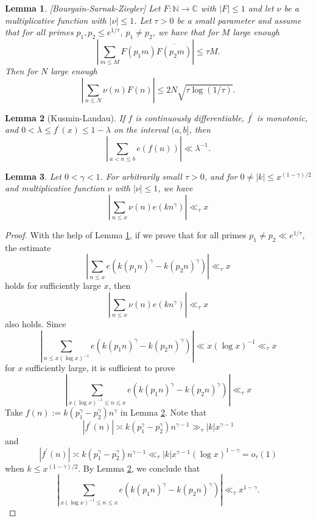 \documentclass[a4paper,10pt]{amsart}
\newtheorem{lemma}{Lemma}[section]
\begin{document}
\begin{lemma} \label{Le_BSZ} [Bourgain-Sarnak-Ziegler]
Let $F: \mathbb{N} \rightarrow \mathbb{C}$ with $|F|\leq 1$ and 
let $\nu$ be a multiplicative function with $|\nu|\leq 1$. Let $\tau>0$ 
be a small parameter and assume that for all primes 
$p_1,p_2\leq e^{1/\tau}$, $p_1\neq p_2$, we have that for $M$ 
large enough
\[
\left|\sum_{m\leq M} F(p_1m)\overline{F(p_2m)}\right|\leq \tau M.
\]
Then for $N$ large enough
\[
\left|\sum_{n\leq N} \nu(n) F(n)\right| \leq 2 N \sqrt{\tau \log (1/\tau)}.
\]
\end{lemma}


\begin{lemma} [Kusmin-Landau] \label{Le_Kus-Lan}
If $f$ is continuously differentiable, $f^\prime$ is monotonic, and $0<\lambda\leq f^\prime(x)\leq 1-\lambda$ on the interval $(a,b]$, then
\[
\left|\sum_{a<n\leq b}e(f(n))\right|\ll \lambda^{-1}.
\]
\end{lemma}

\begin{lemma} \label{Le_multi_exponential}
Let $0<\gamma<1$. For arbitrarily small $\tau>0$, and for 
$0\neq |k|\leq x^{(1-\gamma)/2}$ and multiplicative function 
$\nu$ with $|\nu|\leq 1$, we have
\[
\left|\sum_{n\leq x} \nu(n) e(kn^\gamma)\right| \ll_\tau x
\]
\end{lemma}

\begin{proof}
With the help of Lemma \cref{Le_BSZ}, if we prove that for all 
primes $p_1\neq p_2\ll e^{1/\tau}$, the estimate
\[
\left|\sum_{n\leq x} e(k(p_1n)^\gamma -k (p_2 n)^\gamma)\right| \ll_\tau x
\]
holds for sufficiently large $x$, then
\[
\left|\sum_{n\leq x} \nu(n) e(kn^\gamma)\right| \ll_\tau x
\]
also holds. Since
\[
\left|\sum_{n\leq x(\log x)^{-1}} e(k(p_1n)^\gamma -k (p_2 n)^\gamma)
\right| \ll x(\log x)^{-1} \ll_\tau x
\]
for $x$ sufficiently large, it is sufficient to prove
\[
\left|\sum_{x(\log x)^{-1}\leq n\leq x} e(k(p_1n)^\gamma 
-k (p_2 n)^\gamma)\right| \ll_\tau x
\]
Take $f(n):=k(p_1^\gamma -p_2 ^\gamma) n^\gamma$ in Lemma \cref{Le_Kus-Lan}.
Note that
\[
|f^\prime(n)|\asymp k (p_1^\gamma -p_2 ^\gamma) n^{\gamma-1} 
\gg_\tau |k| x^{\gamma-1}
\]
and
\[
|f^\prime(n)|\asymp k (p_1^\gamma -p_2 ^\gamma) n^{\gamma-1} 
\ll_\tau |k| x^{\gamma-1} (\log x)^{1-\gamma}=\textit{o}_\tau(1)
\]
when $k\leq x^{(1-\gamma)/2}$. By Lemma \cref{Le_Kus-Lan}, we conclude that
\[
\left|\sum_{x(\log x)^{-1}\leq n\leq x} e(k(p_1n)^\gamma 
-k (p_2 n)^\gamma)\right| \ll_\tau x^{1-\gamma}.
\]
\end{proof}
\end{document}
